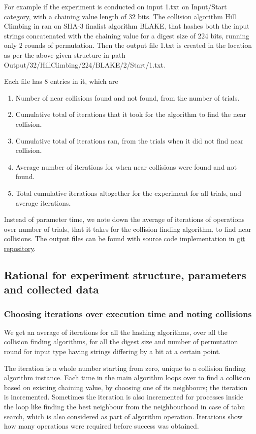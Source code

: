 For example if the experiment is conducted on input 1.txt on Input/Start category, with a chaining value length of 
32 bits. The collision algorithm Hill Climbing in ran on SHA-3 finalist algorithm BLAKE, that hashes both the input 
strings concatenated with the chaining value for a digest size of 224 bits, running only 2 rounds of permutation.
Then the output file 1.txt is created in the location as per the above given structure in path 
Output/32/HillClimbing/224/BLAKE/2/Start/1.txt.

Each file has 8 entries in it, which are 
\begin{enumerate}
\item Number of near collisions found and not found, from the number of trials.
\item Cumulative total of iterations that it took for the algorithm to find the near collision.
\item Cumulative total of iterations ran, from the trials when it did not find near collision.
\item Average number of iterations for when near collisions were found and not found.
\item Total cumulative iterations altogether for the experiment for all trials, and average iterations.
\end{enumerate}

Instead of parameter time, we note down the average of iterations of operations over number of trials, that it
takes for the collision finding algorithm, to find near collisions. The output files can be found with source code
implementation in \href{"https://github.com/sxs9174/MSProjectCode/tree/master/MSProjectCode/Output"}
{git repository}.

\subsection{Rational for experiment structure, parameters and collected data}

\subsubsection{Choosing iterations over execution time and noting collisions}
We get an average of iterations for all the hashing algorithms, over all the collision finding algorithms,
for all the digest size and number of permutation round for input type having strings differing by a bit at 
a certain point.

The iteration is a whole number starting from zero, unique to a collision finding algorithm instance. Each time in
the main algorithm loops over to find a collision based on existing chaining value, by choosing one of its
neighbours; the iteration is incremented. Sometimes the iteration is also incremented for processes inside the
loop like finding the best neighbour from the neighbourhood in case of tabu search, which is also considered as
part of algorithm operation. Iterations show how many operations were required before success was obtained.

